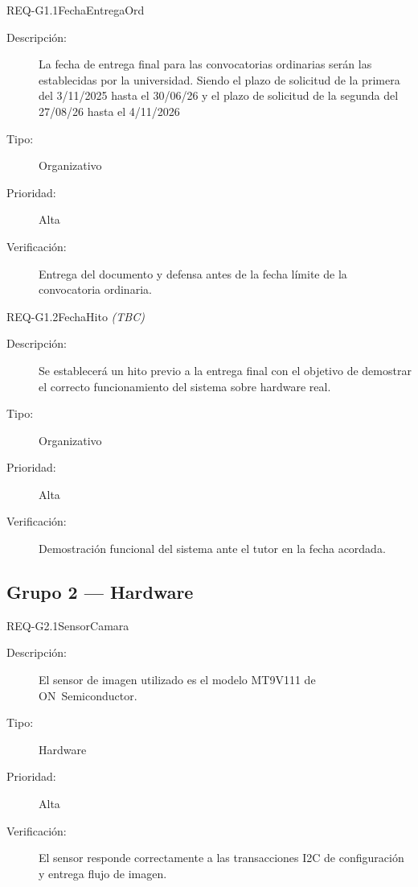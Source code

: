 \documentclass[../main.tex]{subfiles}
\begin{document}
\begin{requisito}{REQ-G1.1}{FechaEntregaOrd}
\begin{description}
    \item[Descripción:]   La fecha de entrega final para las convocatorias ordinarias serán las establecidas por la universidad. Siendo el plazo de solicitud de la primera del 3/11/2025 hasta el 30/06/26 y el plazo de solicitud de la segunda del 27/08/26 hasta el 4/11/2026
    \item[Tipo:]          Organizativo
    \item[Prioridad:]     Alta
    \item[Verificación:]  Entrega del documento y defensa antes de la fecha límite de la convocatoria ordinaria.
\end{description}
\end{requisito}

\begin{requisito}{REQ-G1.2}{FechaHito \emph{(TBC)}}
\begin{description}
    \item[Descripción:]   Se establecerá un hito previo a la entrega final con el objetivo de demostrar el correcto funcionamiento del sistema sobre hardware real.
    \item[Tipo:]          Organizativo
    \item[Prioridad:]     Alta
    \item[Verificación:]  Demostración funcional del sistema ante el tutor en la fecha acordada.
\end{description}
\end{requisito}

\subsection{Grupo 2 — Hardware}

\begin{requisito}{REQ-G2.1}{SensorCamara}
\begin{description}
    \item[Descripción:]   El sensor de imagen utilizado es el modelo MT9V111 de ON~Semiconductor.
    \item[Tipo:]          Hardware
    \item[Prioridad:]     Alta
    \item[Verificación:]  El sensor responde correctamente a las transacciones I2C de configuración y entrega flujo de imagen.
\end{description}
\end{requisito}
\end{document}
